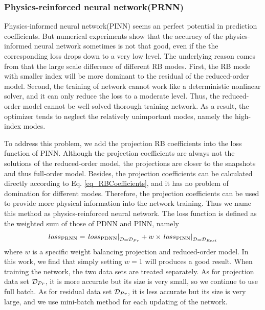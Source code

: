\documentclass[preprint, 10pt]{elsarticle}
\begin{document}
\subsubsection{Physics-reinforced neural network(PRNN)}
\label{PRNN}
Physics-informed neural network(PINN) seems an perfect potential in prediction coefficients. But numerical experiments show that  the accuracy of the physics-informed neural network sometimes is not that good, even if the the corresponding loss drops down to a very low level. The underlying reason comes from that the large scale difference of different RB modes.
First, the RB mode with smaller index will be more dominant to the residual of the reduced-order model. Second, the training of network cannot work like a deterministic nonlinear solver, and it can only reduce the loss to a moderate level. Thus, the reduced-order model cannot be well-solved thorough training network. As a result, the optimizer tends to neglect the relatively unimportant modes, namely the high-index modes.

To address this problem, we add the projection RB coefficients into the loss function of PINN. Although the projection coefficients are always not the solutions of the reduced-order model, the projections are closer to the snapshots and thus full-order model. Besides, the projection coefficients can be calculated directly according to Eq. \ref{eq_RBCoefficients}, and it has no problem of domination for different modes. Therefore, the projection coefficients can be used to provide more physical information into the network training. Thus we name this method as physics-reinforced neural network. The loss function is defined as the weighted sum of those of PDNN and PINN, namely
\begin{equation}
{loss}_{\rm{PRNN}} =
\left. {{loss}_{\rm{PDNN}}} \right|_{{\cal{D}} = {\cal {D}}_{Pr} }
+
w \times \left. {{loss}_{\rm{PINN}}} \right|_{{\cal D} = {\cal D}_{Resi }}
\label{eq_lossPRNN}
\end{equation}
where $w$ is a specific weight balancing projection and reduced-order model. In this work, we find that simply setting $w=1$ will produces a good result.  When training the network, the two data sets are treated separately. As for projection data set ${\cal D}_{Pr}$, it is more accurate but its size is very small, so we continue to use full batch. As for residual data set ${\cal D}_{Pr}$, it is less accurate but its size is very large, and we use mini-batch method for each updating of the network.
\end{document}
